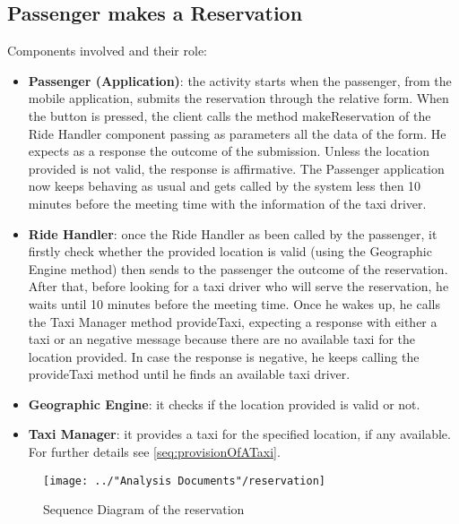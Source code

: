 \subsection{Passenger makes a Reservation}\label{seq:passengerMakesReservation}
Components involved and their role:
\begin{itemize}
	\item \textbf{Passenger (Application)}: the activity starts when the passenger, from the mobile application, submits the reservation through the relative form. When the button is pressed, the client calls the method makeReservation of the Ride Handler component passing as parameters all the data of the form. He expects as a response the outcome of the submission. Unless the location provided is not valid, the response is affirmative. The Passenger application now keeps behaving as usual and gets called by the system less then 10 minutes before the meeting time with the information of the taxi driver.
	\item \textbf{Ride Handler}: once the Ride Handler as been called by the passenger, it firstly check whether the provided location is valid (using the Geographic Engine method) then sends to the passenger the outcome of the reservation. After that, before looking for a taxi driver who will serve the reservation, he waits until 10 minutes before the meeting time. Once he wakes up, he calls the Taxi Manager method provideTaxi, expecting a response with either a taxi or an negative message because there are no available taxi for the location provided. In case the response is negative, he keeps calling the provideTaxi method until he finds an available taxi driver.
	\item \textbf{Geographic Engine}: it checks if the location provided is valid or not.
	\item \textbf{Taxi Manager}: it provides a taxi for the specified location, if any available. For further details see \ref{seq:provisionOfATaxi}.
\end{itemize}
\begin{figure}[H]
	\centering
	\texttt{[image: ../"Analysis Documents"/reservation]}
	\label{fig:reservation_seq}
	\caption{Sequence Diagram of the reservation}
\end{figure}

